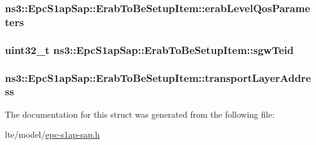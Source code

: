 \subsubsection[{\texorpdfstring{erab\+Level\+Qos\+Parameters}{erabLevelQosParameters}}]{ ns3\+::\+Epc\+S1ap\+Sap\+::\+Erab\+To\+Be\+Setup\+Item\+::erab\+Level\+Qos\+Parameters}\hypertarget{structns3_1_1EpcS1apSap_1_1ErabToBeSetupItem_a8ae1c83db86bbdc5e303cab662f09438}{}\label{structns3_1_1EpcS1apSap_1_1ErabToBeSetupItem_a8ae1c83db86bbdc5e303cab662f09438}
\subsubsection[{\texorpdfstring{sgw\+Teid}{sgwTeid}}]{\setlength{\rightskip}{0pt plus 5cm}uint32\+\_\+t ns3\+::\+Epc\+S1ap\+Sap\+::\+Erab\+To\+Be\+Setup\+Item\+::sgw\+Teid}\hypertarget{structns3_1_1EpcS1apSap_1_1ErabToBeSetupItem_ad716ebafa3da5c8a98fcc544357452dd}{}\label{structns3_1_1EpcS1apSap_1_1ErabToBeSetupItem_ad716ebafa3da5c8a98fcc544357452dd}
\subsubsection[{\texorpdfstring{transport\+Layer\+Address}{transportLayerAddress}}]{ ns3\+::\+Epc\+S1ap\+Sap\+::\+Erab\+To\+Be\+Setup\+Item\+::transport\+Layer\+Address}\hypertarget{structns3_1_1EpcS1apSap_1_1ErabToBeSetupItem_a6c0f1e80dc0f78d54f859f0158af24c4}{}\label{structns3_1_1EpcS1apSap_1_1ErabToBeSetupItem_a6c0f1e80dc0f78d54f859f0158af24c4}


The documentation for this struct was generated from the following file\+:\begin{DoxyCompactItemize}
\item 
lte/model/\hyperlink{epc-s1ap-sap_8h}{epc-\/s1ap-\/sap.\+h}\end{DoxyCompactItemize}
